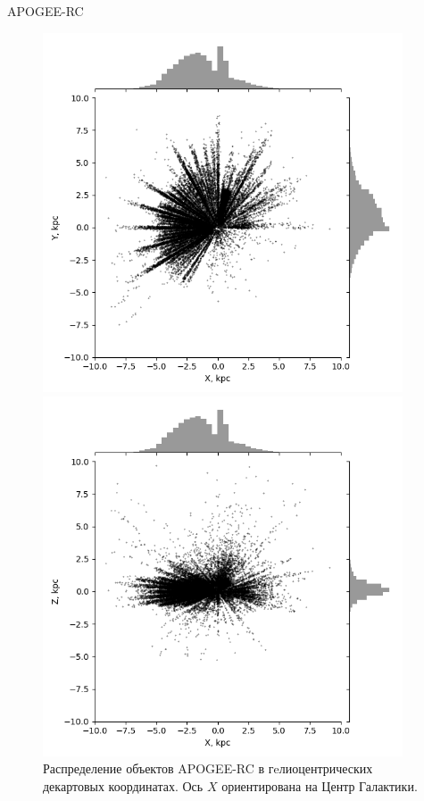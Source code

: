 \documentclass{beamer}
\begin{document}
\begin{frame}{APOGEE-RC}

\begin{figure}[h!]
\begin{minipage}[h]{0.49\linewidth}
        \includegraphics[width=0.95\textwidth]{../imgs/XYobj.png}
\end{minipage}
\hfill
\begin{minipage}[h]{0.49\linewidth}
        \includegraphics[width=0.95\textwidth]{../imgs/XZobj.png}
\end{minipage}
\caption{Распределение объектов APOGEE-RC в гeлиоцентрических декартовых координатах. Ось $X$ ориентирована на Центр Галактики. }
\end{figure}


\end{frame}
\end{document}
